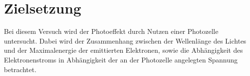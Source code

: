 \section{Zielsetzung}
\label{sec:Zielsetzung}

Bei diesem Versuch wird der Photoeffekt durch Nutzen einer Photozelle untersucht.
Dabei wird der Zusammenhang zwischen der Wellenlänge des Lichtes und der Maximalenergie der emittierten Elektronen, sowie die Abhängigkeit des Elektronenstroms in Abhängigkeit der an der Photozelle angelegten Spannung betrachtet.

